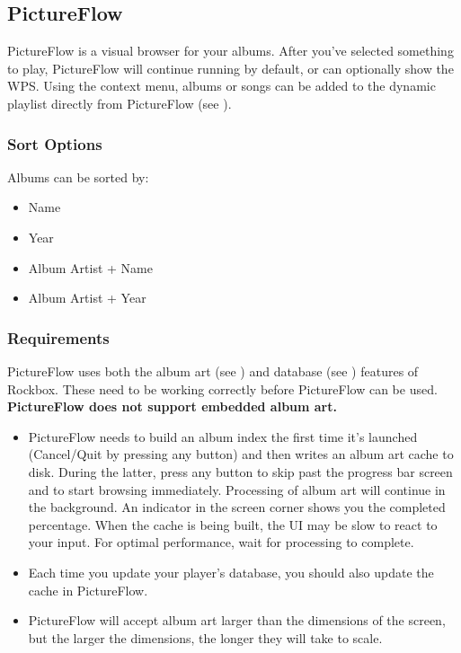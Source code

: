 \subsection{PictureFlow}
PictureFlow is a visual browser for your albums.  After you've selected something to play,
PictureFlow will continue running by default, or can optionally show the WPS. Using the
context menu, albums or songs can be added to the dynamic playlist directly from
PictureFlow (see ).


\subsubsection{Sort Options}
Albums can be sorted by:

\begin{itemize}
    \item Name
    \item Year
    \item Album Artist + Name
    \item Album Artist + Year
\end{itemize}

\subsubsection{Requirements}
PictureFlow uses both the album art (see ) and
database (see ) features of Rockbox.
These need to be working correctly before PictureFlow can be used.
\textbf{PictureFlow does not support embedded album art.}




  \begin{itemize}
    \item PictureFlow needs to build an album index the first time it's launched
    (Cancel/Quit by pressing any button) and then writes an album art cache to disk.
    During the latter, press any button to skip past the progress bar screen and
    to start browsing immediately. Processing of album art will continue in the
    background. An indicator in the screen corner shows you the completed percentage.
    When the cache is being built, the UI may be slow to react to your input.
    For optimal performance, wait for processing to complete.
    \item Each time you update your player's database, you should also update the cache
    in PictureFlow.
    \item PictureFlow will accept album art larger than the dimensions of the
    screen, but the larger the dimensions, the longer they will take to scale.
  \end{itemize}

